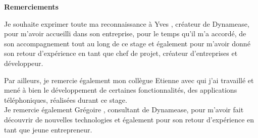 \begin{center}
        \Huge{\bf Remerciements}\\[1.5cm]
\end{center}

Je souhaite exprimer toute ma reconnaissance à Yves , créateur de Dynamease, pour m’avoir accueilli dans son entreprise, pour le temps qu’il m’a accordé, de son accompagnement tout au long de ce stage et également pour m'avoir donné son retour d'expérience en tant que chef de projet, créateur d'entreprises et développeur.

Par ailleurs, je remercie également mon collègue Etienne  avec qui j’ai travaillé et mené à bien le développement de certaines fonctionnalités, des applications téléphoniques, réalisées durant ce stage.\\

Je remercie également Grégoire , consultant de Dynamease, pour m'avoir fait découvrir de nouvelles technologies et également pour son retour d'expérience en tant que jeune entrepreneur. 